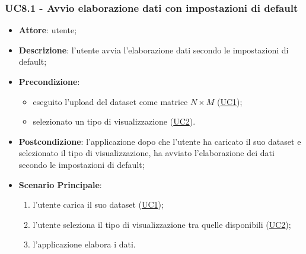     \subsubsection{UC8.1 - Avvio elaborazione dati con impostazioni di default}
    \label{uc8.1}
    \begin{itemize}
    \item \textbf{Attore}: utente;
    \item \textbf{Descrizione}: l'utente avvia l'elaborazione dati secondo le impostazioni di default;
    \item \textbf{Precondizione}: 
    \begin{itemize}
        \item eseguito l'upload del dataset come matrice $N\times M$ (\hyperref[uc1]{UC1});
        \item selezionato un tipo di visualizzazione (\hyperref[uc2]{UC2}).
    \end{itemize}  
    \item \textbf{Postcondizione}: l'applicazione dopo che l'utente ha caricato il suo dataset e selezionato il tipo di visualizzazione, ha avviato l'elaborazione dei dati secondo le impostazioni di default;
    \item \textbf{Scenario Principale}: 
    \begin{enumerate}
        \item l'utente carica il suo dataset (\hyperref[uc1]{UC1});
        \item l'utente seleziona il tipo di visualizzazione tra quelle disponibili (\hyperref[uc2]{UC2});
        \item l'applicazione elabora i dati.
    \end{enumerate}
    \end{itemize}
    

